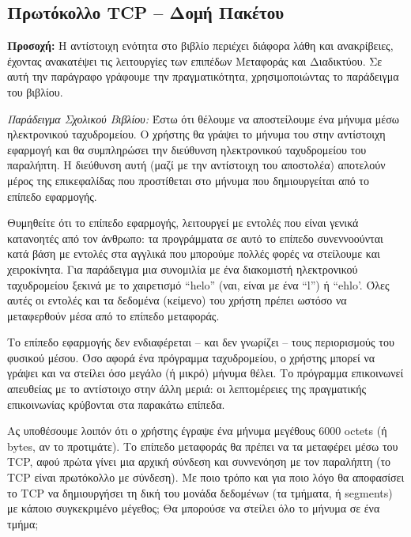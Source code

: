 %
%
\subsection{Πρωτόκολλο TCP -- Δομή Πακέτου}

\begin{inthebox}
\textbf{Προσοχή:} Η αντίστοιχη ενότητα στο βιβλίο περιέχει διάφορα λάθη και ανακρίβειες, έχοντας ανακατέψει τις λειτουργίες των επιπέδων Μεταφοράς και Διαδικτύου. Σε αυτή την παράγραφο γράφουμε την πραγματικότητα, χρησιμοποιώντας το παράδειγμα του βιβλίου.\\
\end{inthebox}


\emph{Παράδειγμα Σχολικού Βιβλίου:} Έστω ότι θέλουμε να αποστείλουμε ένα μήνυμα μέσω ηλεκτρονικού ταχυδρομείου. Ο χρήστης θα γράψει το μήνυμα του στην αντίστοιχη εφαρμογή και θα συμπληρώσει την διεύθυνση ηλεκτρονικού ταχυδρομείου του παραλήπτη. Η διεύθυνση αυτή (μαζί με την αντίστοιχη του αποστολέα) αποτελούν μέρος της επικεφαλίδας που προστίθεται στο μήνυμα που δημιουργείται από το επίπεδο εφαρμογής.

Θυμηθείτε ότι το επίπεδο εφαρμογής, λειτουργεί με εντολές που είναι γενικά κατανοητές από τον άνθρωπο: τα προγράμματα σε αυτό το επίπεδο συνεννοούνται κατά βάση με εντολές στα αγγλικά που μπορούμε πολλές φορές να στείλουμε και χειροκίνητα. Για παράδειγμα μια συνομιλία με ένα διακομιστή ηλεκτρονικού ταχυδρομείου ξεκινά με το χαιρετισμό ``helo'' (ναι, είναι με ένα ``l'') ή ``ehlo'. Όλες αυτές οι εντολές και τα δεδομένα (κείμενο) του χρήστη πρέπει ωστόσο να μεταφερθούν μέσα από το επίπεδο μεταφοράς.

Το επίπεδο εφαρμογής δεν ενδιαφέρεται -- και δεν γνωρίζει -- τους περιορισμούς του φυσικού μέσου. Όσο αφορά ένα πρόγραμμα ταχυδρομείου, ο χρήστης μπορεί να γράψει και να στείλει όσο μεγάλο (ή μικρό) μήνυμα θέλει. Το πρόγραμμα επικοινωνεί απευθείας με το αντίστοιχο στην άλλη μεριά: οι λεπτομέρειες της πραγματικής επικοινωνίας κρύβονται στα παρακάτω επίπεδα.

Ας υποθέσουμε λοιπόν ότι ο χρήστης έγραψε ένα μήνυμα μεγέθους 6000 octets (ή bytes, αν το προτιμάτε). Το επίπεδο μεταφοράς θα πρέπει να τα μεταφέρει μέσω του TCP, αφού πρώτα γίνει μια αρχική σύνδεση και συννενόηση με τον παραλήπτη (το TCP είναι πρωτόκολλο με σύνδεση). Με ποιο τρόπο και για ποιο λόγο θα αποφασίσει το TCP να δημιουργήσει τη δική του μονάδα δεδομένων (τα τμήματα, ή segments) με κάποιο συγκεκριμένο μέγεθος; Θα μπορούσε να στείλει όλο το μήνυμα σε ένα τμήμα;

